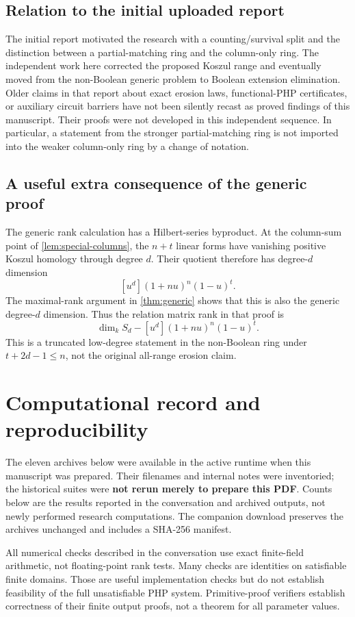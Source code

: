 \section{Relation to the initial uploaded report}
The initial report motivated the research with a counting/survival split and the distinction between a partial-matching ring and the column-only ring. The independent work here corrected the proposed Koszul range and eventually moved from the non-Boolean generic problem to Boolean extension elimination. Older claims in that report about exact erosion laws, functional-PHP certificates, or auxiliary circuit barriers have not been silently recast as proved findings of this manuscript. Their proofs were not developed in this independent sequence. In particular, a statement from the stronger partial-matching ring is not imported into the weaker column-only ring by a change of notation.

\section{A useful extra consequence of the generic proof}
The generic rank calculation has a Hilbert-series byproduct. At the column-sum point of \cref{lem:special-columns}, the $n+t$ linear forms have vanishing positive Koszul homology through degree $d$. Their quotient therefore has degree-$d$ dimension
\[
 [u^d](1+nu)^n(1-u)^t.
\]
The maximal-rank argument in \cref{thm:generic} shows that this is also the generic degree-$d$ dimension. Thus the relation matrix rank in that proof is
\[
 \dim_k S_d-[u^d](1+nu)^n(1-u)^t.
\]
This is a truncated low-degree statement in the non-Boolean ring under $t+2d-1\le n$, not the original all-range erosion claim.

\chapter{Computational record and reproducibility}\label{app:computations}
The eleven archives below were available in the active runtime when this manuscript was prepared. Their filenames and internal notes were inventoried; the historical suites were \textbf{not rerun merely to prepare this PDF}. Counts below are the results reported in the conversation and archived outputs, not newly performed research computations. The companion download preserves the archives unchanged and includes a SHA-256 manifest.

All numerical checks described in the conversation use exact finite-field arithmetic, not floating-point rank tests. Many checks are identities on satisfiable finite domains. Those are useful implementation checks but do not establish feasibility of the full unsatisfiable PHP system. Primitive-proof verifiers establish correctness of their finite output proofs, not a theorem for all parameter values.

